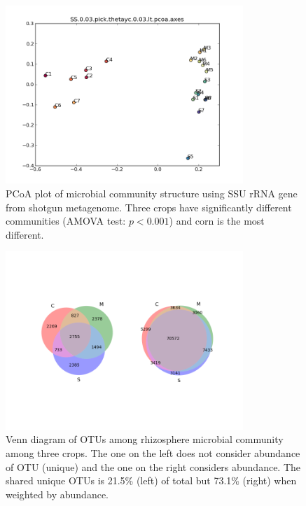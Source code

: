 \documentclass[12pt]{article}
\begin{document}
{    \begin{figure}[tbph!]
    \centering
    \includegraphics[width=0.8\textwidth]{figures/otu-pcoa.png}
    \caption[PCoA plot of microbial community structure using SSU rRNA gene]{PCoA plot of microbial community structure using SSU rRNA gene from shotgun metagenome. Three crops have significantly different communities (AMOVA test: $p < 0.001$) and corn is the most different.}
    \label{fig:otu-pcoa}
    \end{figure}


    \begin{figure}[tbph!]
    \centering
    \includegraphics[width=0.8\textwidth]{figures/otu.venn}
    \caption[Venn diagram of OTUs]{Venn diagram of OTUs among rhizosphere microbial community among three crops. The one on the left does not consider abundance of OTU (unique) and the one on the right considers abundance. The shared unique OTUs is 21.5\% (left) of total but 73.1\% (right) when weighted by abundance.}
    \label{fig:otu.venn}
    \end{figure}


}
\end{document}
